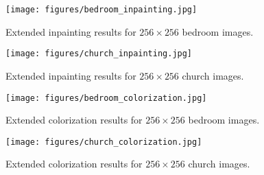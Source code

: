 \documentclass{article} \usepackage{iclr2021_conference,times}
\begin{document}
\begin{figure}
    \centering
    \texttt{[image: figures/bedroom\_inpainting.jpg]}
    \caption{Extended inpainting results for $256\times 256$ bedroom images.}
    \label{fig:bedroom_inpainting}
\end{figure}

\begin{figure}
    \centering
    \texttt{[image: figures/church\_inpainting.jpg]}
    \caption{Extended inpainting results for $256\times 256$ church images.}
    \label{fig:church_inpainting}
\end{figure}

\begin{figure}
    \centering
    \texttt{[image: figures/bedroom\_colorization.jpg]}
    \caption{Extended colorization results for $256\times 256$ bedroom images.}
    \label{fig:bedroom_colorization}
\end{figure}

\begin{figure}
    \centering
    \texttt{[image: figures/church\_colorization.jpg]}
    \caption{Extended colorization results for $256\times 256$ church images.}
    \label{fig:church_colorization}
\end{figure}
 
\end{document}
